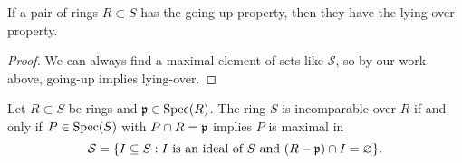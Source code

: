 \documentclass{ximera}
\begin{document}
\begin{corollary}
  If a pair of rings $R\subset S$ has the going-up property, then they
  have the lying-over property.
  \begin{proof}
    We can always find a maximal element of sets like $\mathcal{S}$,
    so by our work above, going-up implies lying-over.
  \end{proof}
\end{corollary}


\begin{proposition}
  Let $R\subset S$ be rings and $\mathfrak{p}\in\operatorname{Spec}(R)$. The ring $S$ is
  incomparable over $R$ if and only if $P\in\operatorname{Spec}(S)$ with $P\cap R
  =\mathfrak{p}$ implies $P$ is maximal in
  \[
  \mathcal{S} = \{I\subseteq S: \text{$I$ is an ideal of $S$ and
    $(R-\mathfrak{p})\cap I = \varnothing$}\}.
  \]
\end{proposition}
\end{document}
